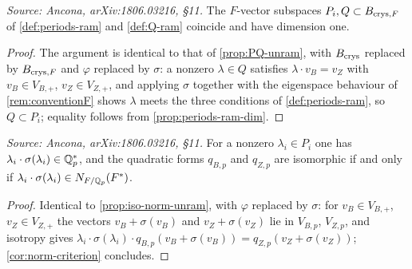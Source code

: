 \begin{proposition}[\(P_i = Q\), ramified case]
  \label{prop:PQ-ram}
  \textit{Source: Ancona, arXiv:1806.03216, \S11.}
  The \(F\)-vector subspaces \(P_i, Q \subset B_{\mathrm{crys},F}\) of
  \cref{def:periods-ram} and \cref{def:Q-ram} coincide and have dimension one.
\end{proposition}

\begin{proof}
  The argument is identical to that of \cref{prop:PQ-unram}, with \(B_{\mathrm{crys}}\)
  replaced by \(B_{\mathrm{crys},F}\) and \(\varphi\) replaced by \(\sigma\): a nonzero
  \(\lambda \in Q\) satisfies \(\lambda \cdot v_B = v_Z\) with \(v_B \in V_{B,+}\),
  \(v_Z \in V_{Z,+}\), and applying \(\sigma\) together with the eigenspace
  behaviour of \cref{rem:conventionF} shows \(\lambda\) meets the three
  conditions of \cref{def:periods-ram}, so \(Q \subset P_i\); equality follows
  from \cref{prop:periods-ram-dim}.
\end{proof}

\begin{proposition}
  \label{prop:iso-norm-ram}
  \textit{Source: Ancona, arXiv:1806.03216, \S11.}
  For a nonzero \(\lambda_i \in P_i\) one has
  \(\lambda_i \cdot \sigma(\lambda_i) \in \mathbb{Q}_p^*\), and the quadratic forms
  \(q_{B,p}\) and \(q_{Z,p}\) are isomorphic if and only if
  \(\lambda_i \cdot \sigma(\lambda_i) \in N_{F/\mathbb{Q}_p}(F^*)\).
\end{proposition}

\begin{proof}
  Identical to \cref{prop:iso-norm-unram}, with \(\varphi\) replaced by
  \(\sigma\): for \(v_B \in V_{B,+}\), \(v_Z \in V_{Z,+}\) the vectors
  \(v_B + \sigma(v_B)\) and \(v_Z + \sigma(v_Z)\) lie in \(V_{B,p}\), \(V_{Z,p}\),
  and isotropy gives
  \(\lambda_i \cdot \sigma(\lambda_i) \cdot q_{B,p}(v_B + \sigma(v_B)) =
  q_{Z,p}(v_Z + \sigma(v_Z))\); \cref{cor:norm-criterion} concludes.
\end{proof}

